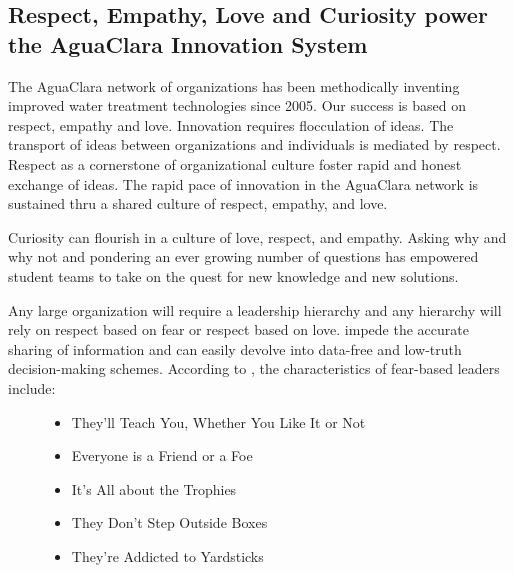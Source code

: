 \documentclass[letterpaper,10pt,english]{sphinxmanual}
\begin{document}
\subsection{Respect, Empathy, Love and Curiosity power the AguaClara Innovation System}
\label{\detokenize{Introduction/Introduction:respect-empathy-love-and-curiosity-power-the-aguaclara-innovation-system}}\label{\detokenize{Introduction/Introduction:heading-empathy}}
The AguaClara network of organizations has been methodically inventing improved water treatment technologies since 2005. Our success is based on respect, empathy and love. Innovation requires flocculation of ideas. The transport of ideas between organizations and individuals is mediated by respect. Respect as a cornerstone of organizational culture foster rapid and honest exchange of ideas. The rapid pace of innovation in the AguaClara network is sustained thru a shared culture of respect, empathy, and love.

Curiosity can flourish in a culture of love, respect, and empathy. Asking why and why not and pondering an ever growing number of questions has empowered student teams to take on the quest for new knowledge and new solutions.
\begin{description}
\item[{Any large organization will require a leadership hierarchy and any hierarchy will rely on respect based on fear or respect based on love.  impede the accurate sharing of information and can easily devolve into data-free and low-truth decision-making schemes. According to , the characteristics of fear-based leaders include:}] \leavevmode\begin{itemize}
\item {} 
They’ll Teach You, Whether You Like It or Not

\item {} 
Everyone is a Friend or a Foe

\item {} 
It’s All about the Trophies

\item {} 
They Don’t Step Outside Boxes

\item {} 
They’re Addicted to Yardsticks

\end{itemize}

\end{description}
\end{document}
